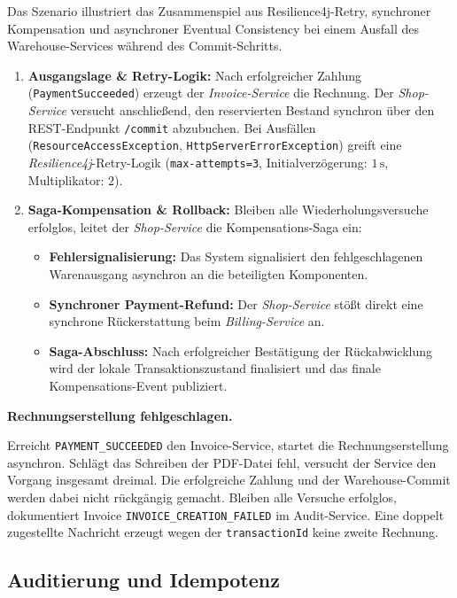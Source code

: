 \documentclass[
  11pt,
  a4paper,
  oneside,
  headings=normal,
  parskip=half,
  DIV=12
]{scrreprt}
\begin{document}
Das Szenario illustriert das Zusammenspiel aus Resilience4j-Retry, synchroner Kompensation und asynchroner Eventual Consistency bei einem Ausfall des Warehouse-Services während des Commit-Schritts.

\begin{enumerate}
    \item \textbf{Ausgangslage \& Retry-Logik:}
    Nach erfolgreicher Zahlung (\texttt{PaymentSucceeded}) erzeugt der \textit{Invoice-Service} die Rechnung. Der \textit{Shop-Service} versucht anschließend, den reservierten Bestand synchron über den REST-Endpunkt \texttt{/commit} abzubuchen. Bei Ausfällen (\texttt{ResourceAccessException}, \texttt{HttpServerErrorException}) greift eine \textit{Resilience4j}-Retry-Logik (\texttt{max-attempts=3}, Initialverzögerung: $1\,\mathrm{s}$, Multiplikator: $2$).

 \item \textbf{Saga-Kompensation \& Rollback:}
Bleiben alle Wiederholungsversuche erfolglos, leitet der \textit{Shop-Service} die Kompensations-Saga ein:
\begin{itemize}
    \item \textbf{Fehlersignalisierung:} Das System signalisiert den fehlgeschlagenen Warenausgang asynchron an die beteiligten Komponenten.
    \item \textbf{Synchroner Payment-Refund:} Der \textit{Shop-Service} stößt direkt eine synchrone Rückerstattung beim \textit{Billing-Service} an.
    \item \textbf{Saga-Abschluss:} Nach erfolgreicher Bestätigung der Rückabwicklung wird der lokale Transaktionszustand finalisiert und das finale Kompensations-Event publiziert.
\end{itemize}
\end{enumerate}


\textbf{Rechnungserstellung fehlgeschlagen.}

Erreicht \texttt{PAYMENT\_SUCCEEDED} den Invoice-Service, startet die
Rechnungserstellung asynchron. Schlägt das Schreiben der PDF-Datei fehl,
versucht der Service den Vorgang insgesamt dreimal. Die erfolgreiche Zahlung
und der Warehouse-Commit werden dabei nicht rückgängig gemacht. Bleiben alle
Versuche erfolglos, dokumentiert Invoice
\texttt{INVOICE\_CREATION\_FAILED} im Audit-Service. Eine doppelt zugestellte
Nachricht erzeugt wegen der \texttt{transactionId} keine zweite Rechnung.


\subsection{Auditierung und Idempotenz}
\end{document}
